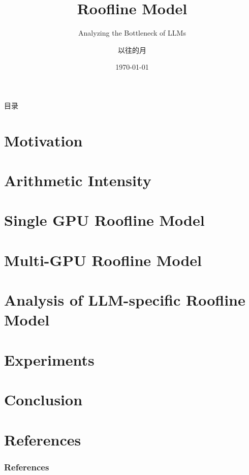 \documentclass[aspectratio=169]{beamer}
\title{Roofline Model}
\subtitle{Analyzing the Bottleneck of LLMs}
\author{以往的月}
\institute{Bilibili}
\date{\today}
\begin{document}
\frame{\titlepage}


\begin{frame}{目录}
  \tableofcontents
\end{frame}

\section{Motivation}


\section{Arithmetic Intensity}

\section{Single GPU Roofline Model}

\section{Multi-GPU Roofline Model}

\section{ Analysis of LLM-specific Roofline Model}

\section{Experiments}

\section{ Conclusion}



\section{References}


\begin{frame}[allowframebreaks]
    \frametitle{References}
    
    
\end{frame}
\end{document}
